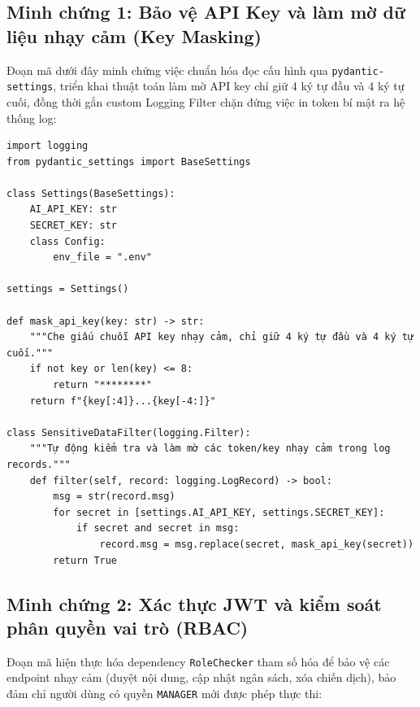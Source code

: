 \subsection{Minh chứng 1: Bảo vệ API Key và làm mờ dữ liệu nhạy cảm (Key Masking)}\label{subsec:v8-code-api-masking}

Đoạn mã dưới đây minh chứng việc chuẩn hóa đọc cấu hình qua \texttt{pydantic-settings}, triển khai thuật toán làm mờ API key chỉ giữ 4 ký tự đầu và 4 ký tự cuối, đồng thời gắn custom Logging Filter chặn đứng việc in token bí mật ra hệ thống log:

\begin{footnotesize}
\begin{verbatim}
import logging
from pydantic_settings import BaseSettings

class Settings(BaseSettings):
    AI_API_KEY: str
    SECRET_KEY: str
    class Config:
        env_file = ".env"

settings = Settings()

def mask_api_key(key: str) -> str:
    """Che giấu chuỗi API key nhạy cảm, chỉ giữ 4 ký tự đầu và 4 ký tự cuối."""
    if not key or len(key) <= 8:
        return "********"
    return f"{key[:4]}...{key[-4:]}"

class SensitiveDataFilter(logging.Filter):
    """Tự động kiểm tra và làm mờ các token/key nhạy cảm trong log records."""
    def filter(self, record: logging.LogRecord) -> bool:
        msg = str(record.msg)
        for secret in [settings.AI_API_KEY, settings.SECRET_KEY]:
            if secret and secret in msg:
                record.msg = msg.replace(secret, mask_api_key(secret))
        return True
\end{verbatim}
\end{footnotesize}

\subsection{Minh chứng 2: Xác thực JWT và kiểm soát phân quyền vai trò (RBAC)}\label{subsec:v8-code-jwt-rbac}

Đoạn mã hiện thực hóa dependency \texttt{RoleChecker} tham số hóa để bảo vệ các endpoint nhạy cảm (duyệt nội dung, cập nhật ngân sách, xóa chiến dịch), bảo đảm chỉ người dùng có quyền \texttt{MANAGER} mới được phép thực thi:

